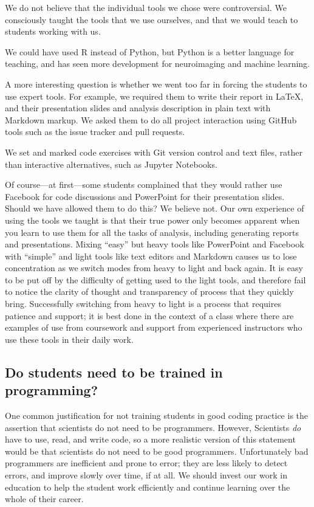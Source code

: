 We do not believe that the individual tools we chose were controversial. We
consciously taught the tools that we use ourselves, and that we would teach to
students working with us.

We could have used R instead of Python, but Python is a better language for
teaching, and has seen more development for neuroimaging and machine learning.

A more interesting question is whether we went too far in forcing the students
to use expert tools.  For example, we required them to write their
report in \LaTeX, and their presentation slides and analysis description in
plain text with Markdown markup.  We asked them to do all project interaction
using GitHub tools such as the issue tracker and pull requests.

We set and marked code exercises with Git version control and text files,
rather than interactive alternatives, such as Jupyter Notebooks.

Of course---at first---some students complained that they would rather use
Facebook for code discussions and PowerPoint for their presentation slides.
Should we have allowed them to do this?  We believe not.  Our own experience
of using the tools we taught is that their true power only becomes apparent
when you learn to use them for all the tasks of analysis, including generating
reports and presentations.  Mixing ``easy'' but heavy tools like PowerPoint
and Facebook with ``simple'' and light tools like text editors and Markdown
causes us to lose concentration as we switch modes from heavy to light and
back again. It is easy to be put off by the difficulty of getting used to the
light tools, and therefore fail to notice the clarity of thought and
transparency of process that they quickly bring.  Successfully switching from
heavy to light is a process that requires patience and support; it is best
done in the context of a class where there are examples of use from coursework
and support from experienced instructors who use these tools in their daily
work.

\subsection{Do students need to be trained in programming?}

One common justification for not training students in good coding practice is
the assertion that scientists do not need to be programmers.  However, Scientists \emph{do}
have to use, read, and write code, so a more realistic version of this
statement would be that scientists do not need to be good programmers.
Unfortunately bad programmers are inefficient and prone to error; they are
less likely to detect errors, and improve slowly over time, if at all.  We
should invest our work in education to help the student work efficiently and
continue learning over the whole of their career.

